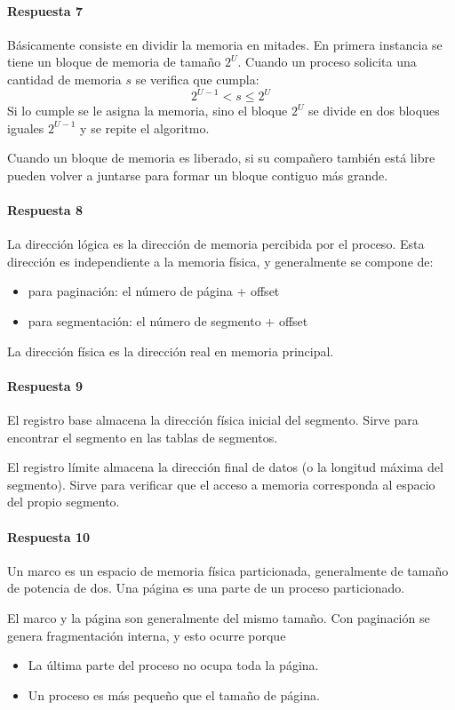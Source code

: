 \paragraph{Respuesta 7}
Básicamente consiste en dividir la memoria en mitades. En primera instancia se tiene un bloque de memoria de tamaño \(2^U\). Cuando un proceso solicita una cantidad de memoria \(s\) se verifica que cumpla:
\[
  2^{U-1}<s\leqslant 2^U
\]
Si lo cumple se le asigna la memoria, sino el bloque \(2^U\) se divide en dos bloques iguales \(2^{U-1}\) y se repite el algoritmo.

Cuando un bloque de memoria es liberado, si su compañero también está libre pueden volver a juntarse para formar un bloque contiguo más grande.

\paragraph{Respuesta 8}
La dirección lógica es la dirección de memoria percibida por el proceso. Esta dirección es independiente a la memoria física, y generalmente se compone de:
\begin{itemize}
  \item para paginación: el número de página + offset
  \item para segmentación: el número de segmento + offset
\end{itemize}

La dirección física es la dirección real en memoria principal.

\paragraph{Respuesta 9}
El registro base almacena la dirección física inicial del segmento. Sirve para encontrar el segmento en las tablas de segmentos.

El registro límite almacena la dirección final de datos (o la longitud máxima del segmento). Sirve para verificar que el acceso a memoria corresponda al espacio del propio segmento.

\paragraph{Respuesta 10}
Un marco es un espacio de memoria física particionada, generalmente de tamaño de potencia de dos. Una página es una parte de un proceso particionado.

El marco y la página son generalmente del mismo tamaño. Con paginación se genera fragmentación interna, y esto ocurre porque
\begin{itemize}
  \item La última parte del proceso no ocupa toda la página.
  \item Un proceso es más pequeño que el tamaño de página.
\end{itemize}

